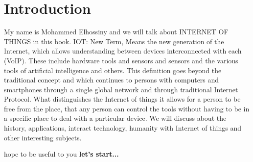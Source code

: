 
\chapter{Introduction}
\subitem
{
	\large{
	My name is Mohammed Elhossiny and we will talk about INTERNET OF THINGS in this book.
	\vspace{5mm} %
	IOT: New Term, Means the new generation of the Internet, which allows understanding between devices interconnected with each (VoIP). These include hardware tools and sensors and sensors and the various tools of artificial intelligence and others. This definition goes beyond the traditional concept and which continues to persons with computers and smartphones through a single global network and through traditional Internet Protocol. What distinguishes the Internet of things it allows for a person to be free from the place, that any person can control the tools without having to be in a specific place to deal with a particular device.
	\vspace{5mm} %
	We will discuss about the history, applications, interact technology, humanity with Internet of things and other interesting subjects. \hfill \break }

    \large{
    	    \vspace{5mm} %
    hope to be useful to you \newline
    \textbf{ let's start...}
                }
            
	
}
